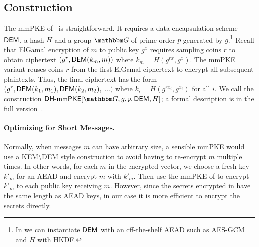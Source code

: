 
\subsection{Construction}
The mmPKE of~\cite{ASIACCS:PinPoeSch14} is straightforward. It requires a
data encapsulation scheme ${\mathsf{DEM}}$, a hash $H$ and a group $\Grp$ of prime order $p$ generated by $g$.\footnote{In \saik we can instantiate ${\mathsf{DEM}}$ with an off-the-shelf
AEAD such as AES-GCM and $H$ with HKDF.} Recall that
ElGamal encryption of $m$ to public key $g^x$ requires sampling coins $r$ to
obtain ciphertext $(g^r, {\mathsf{DEM}}(k_m, m))$ where $k_m = H(g^{rx}, g^x)$. The
mmPKE variant reuses coins $r$ from the first ElGamal ciphertext to encrypt
all subsequent plaintexts. Thus, the final ciphertext has the form $(g^r,
{\mathsf{DEM}}(k_1, m_1), {\mathsf{DEM}}(k_2, m_2),$ $\ldots)$ where $k_i = H(g^{rx_i},
g^{x_i})$ for all $i$. We call the construction $\dhmmpke[\Grp,\allowbreak g,\allowbreak p,\allowbreak \dem, H]$; a
formal description is in the full version~\cite{EPRINT:AHKM21}.

\paragraph{Optimizing for Short Messages.}
Normally, when messages $m$ can have arbitrary size, a sensible mmPKE would use a
KEM{\textbackslash}DEM style construction to avoid having to re-encrypt $m$
multiple times. In other words, for each $m$ in the encrypted vector, we choose a fresh key $k'_m$
for an AEAD and encrypt $m$ with $k'_m$. Then use the mmPKE of
\cite{ASIACCS:PinPoeSch14} to encrypt $k'_m$ to each public key receiving $m$.
However, since the secrets encrypted in \saik have the same length as AEAD
keys, in our case it is more efficient to encrypt the secrets directly.


